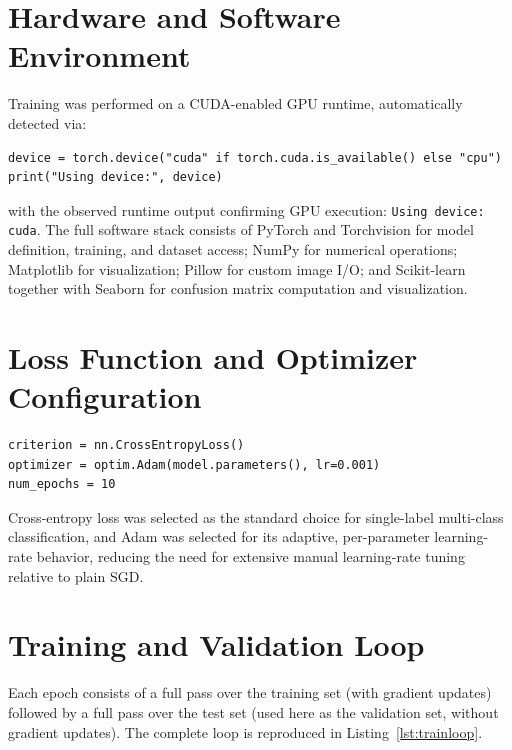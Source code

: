 \documentclass[12pt,a4paper]{report}
\begin{document}
\section{Hardware and Software Environment}
Training was performed on a CUDA-enabled GPU runtime, automatically detected via:

\begin{lstlisting}[caption={Device selection}]
device = torch.device("cuda" if torch.cuda.is_available() else "cpu")
print("Using device:", device)
\end{lstlisting}

with the observed runtime output confirming GPU execution: \texttt{Using device: cuda}. The full software stack consists of PyTorch and Torchvision for model definition, training, and dataset access; NumPy for numerical operations; Matplotlib for visualization; Pillow for custom image I/O; and Scikit-learn together with Seaborn for confusion matrix computation and visualization.

\section{Loss Function and Optimizer Configuration}

\begin{lstlisting}[caption={Loss and optimizer setup}]
criterion = nn.CrossEntropyLoss()
optimizer = optim.Adam(model.parameters(), lr=0.001)
num_epochs = 10
\end{lstlisting}

Cross-entropy loss was selected as the standard choice for single-label multi-class classification, and Adam was selected for its adaptive, per-parameter learning-rate behavior, reducing the need for extensive manual learning-rate tuning relative to plain SGD.

\section{Training and Validation Loop}
Each epoch consists of a full pass over the training set (with gradient updates) followed by a full pass over the test set (used here as the validation set, without gradient updates). The complete loop is reproduced in Listing~\ref{lst:trainloop}.
\end{document}
